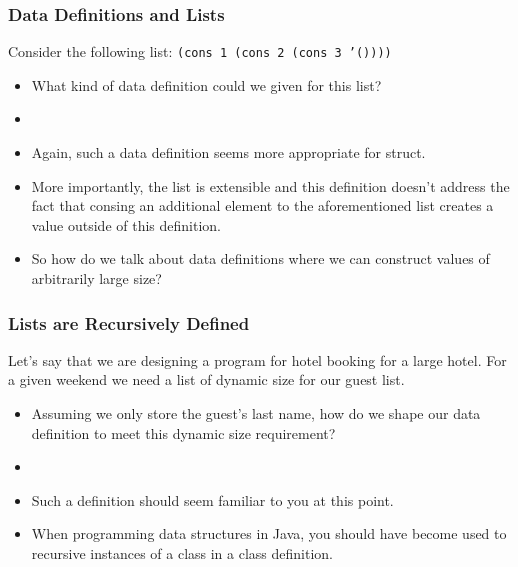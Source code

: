 \documentclass{beamer}
\begin{document}

\begin{frame}
  \frametitle{Data Definitions and Lists}
  Consider the following list: \texttt{(cons 1 (cons 2 (cons 3 '())))}
  \begin{itemize}
  \item<2-> What kind of data definition could we given for this list?
  \item<3-> \ThreeList
  \item<4-> Again, such a data definition seems more appropriate for struct.
  \item<5-> More importantly, the list is extensible and this definition
    doesn't address the fact that consing an additional element to
    the aforementioned list creates a value outside of this definition.
  \item<6-> So how do we talk about data definitions
    where we can construct values of arbitrarily large size?
  \end{itemize}
\end{frame}


\begin{frame}
  \frametitle{Lists are Recursively Defined}
  Let's say that we are designing a program for hotel booking for a large
  hotel. For a given weekend we need a list of dynamic size for our
  guest list.
  \begin{itemize}
  \item<2-> Assuming we only store the guest's last name, how do we shape
    our data definition to meet this dynamic size requirement?
  \item<3-> \ListOfNames
  \item<4-> Such a definition should seem familiar to you at this point.
  \item<5-> When programming data structures in Java, you should have
    become used to recursive instances of a class in a class definition.
  \end{itemize}
\end{frame}
\end{document}
